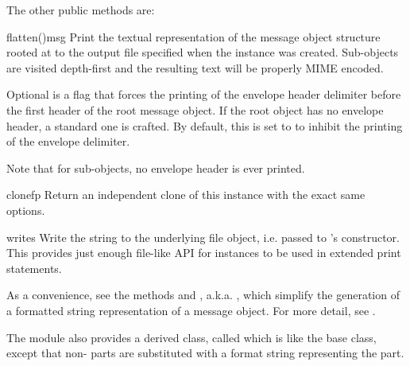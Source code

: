 The other public  methods are:

\begin{methoddesc}[Generator]{flatten()}{msg}
Print the textual representation of the message object structure rooted at
 to the output file specified when the 
instance was created.  Sub-objects are visited depth-first and the
resulting text will be properly MIME encoded.

Optional  is a flag that forces the printing of the
envelope header delimiter before the first  header of the
root message object.  If the root object has no envelope header, a
standard one is crafted.  By default, this is set to  to
inhibit the printing of the envelope delimiter.

Note that for sub-objects, no envelope header is ever printed.

\end{methoddesc}

\begin{methoddesc}[Generator]{clone}{fp}
Return an independent clone of this  instance with
the exact same options.

\end{methoddesc}

\begin{methoddesc}[Generator]{write}{s}
Write the string  to the underlying file object,
i.e.  passed to 's constructor.  This
provides just enough file-like API for  instances to
be used in extended print statements.
\end{methoddesc}

As a convenience, see the methods  and
, a.k.a. , which
simplify the generation of a formatted string representation of a
message object.  For more detail, see .

The  module also provides a derived class,
called  which is like the 
base class, except that non- parts are substituted with
a format string representing the part.

